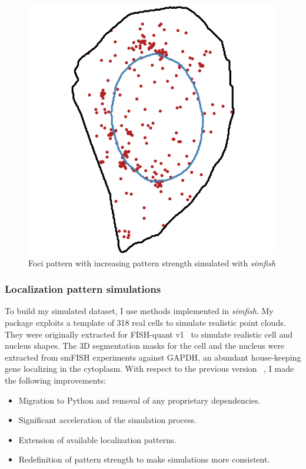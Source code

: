 \begin{figure}[]
	\endminipage\hfill
		\includegraphics[width=\linewidth]{figures/chapter4/simulation_foci_90}
	\endminipage
	\caption[Simulated foci patterns]{Foci pattern with increasing pattern strength simulated with \emph{simfish}}
	\label{fig:foci_panel}
\end{figure}

\subsubsection{Localization pattern simulations}

To build my simulated dataset, I use methods implemented in \emph{simfish}.
My package exploits a template of 318 real cells to simulate realistic point clouds.
They were originally extracted for FISH-quant v1~\cite{samacoits_computational_2018} to simulate realistic cell and nucleus shapes.
The 3D segmentation masks for the cell and the nucleus were extracted from smFISH experiments against GAPDH, an abundant house-keeping gene localizing in the cytoplasm. 
With respect to the previous version ~\cite{samacoits_computational_2018}, I made the following improvements:
\begin{itemize}
	\setlength\itemsep{0.1em}
	\item Migration to Python and removal of any proprietary dependencies.
	\item Significant acceleration of the simulation process.
	\item Extension of available localization patterns.
	\item Redefinition of pattern strength to make simulations more consistent.
\end{itemize}

